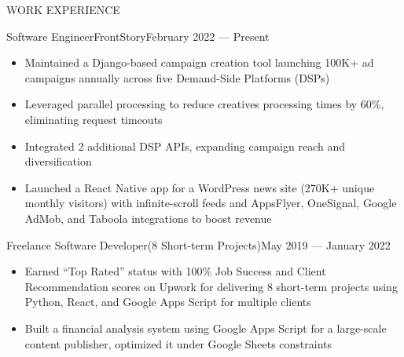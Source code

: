\documentclass[]{mcdowellcv}
\begin{document}
	\makeheader
	
	
	\begin{cvsection}{WORK EXPERIENCE}
		\begin{cvsubsection}{Software Engineer}{FrontStory}{February 2022 — Present}
			\begin{itemize}
				\item Maintained a Django-based campaign creation tool launching 100K+ ad campaigns annually across five Demand-Side Platforms (DSPs)
				\item Leveraged parallel processing to reduce creatives processing times by 60\%, eliminating request timeouts
				\item Integrated 2 additional DSP APIs, expanding campaign reach and diversification
				\item Launched a React Native app for a WordPress news site (270K+ unique monthly visitors) with infinite-scroll feeds and AppsFlyer, OneSignal, Google AdMob, and Taboola integrations to boost revenue
			\end{itemize}
		\end{cvsubsection}
		\begin{cvsubsection}{Freelance Software Developer}{(8 Short-term Projects)}{May 2019 — January 2022}
			\begin{itemize}
				\item Earned “Top Rated” status with 100\% Job Success and Client Recommendation scores on Upwork for delivering 8 short-term projects using Python, React, and Google Apps Script for multiple clients
				\item Built a financial analysis system using Google Apps Script for a large-scale content publisher, optimized it under Google Sheets constraints
			\end{itemize}
		\end{cvsubsection}
	\end{cvsection}
	
\end{document}
